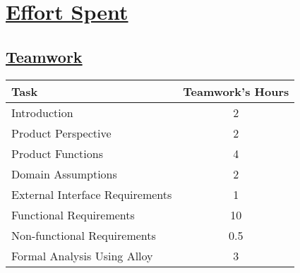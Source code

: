 \section[Effort Spent]{\hyperlink{toc}{Effort Spent}}
\label{sec:effortSpent}

\subsection[Teamwork]{\hyperlink{toc}{Teamwork}}
\vspace{2mm}
\begin{center}
	\begin{tabular}{| l | c |}
		\hline
		\textbf{Task} & \textbf{Teamwork's Hours} \\ \hline
		Introduction & 2 \\ \hline
		Product Perspective & 2 \\ \hline
		Product Functions & 4 \\ \hline
		Domain Assumptions & 2 \\ \hline
		External Interface Requirements & 1 \\ \hline
		Functional Requirements & 10 \\ \hline
		Non-functional Requirements & 0.5 \\ \hline
		Formal Analysis Using Alloy & 3 \\
		\hline	
	\end{tabular}
\end{center}

